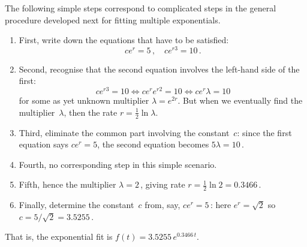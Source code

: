\begin{draft}
\begin{example}
\begin{solution}
The following simple steps correspond to complicated steps in the general procedure developed next for fitting multiple exponentials.
\begin{enumerate}
\item First, write down the equations that have to be satisfied:
\begin{equation*}
ce^{r}=5\,,\quad ce^{r3}=10\,.
\end{equation*}
\item Second, recognise that the second equation involves the left-hand side of the first:
\begin{equation*}
ce^{r3}=10 \iff ce^re^{r2}=10\iff ce^r\lambda=10
\end{equation*}
for some as yet unknown multiplier \(\lambda=e^{2r}\).
But when we eventually find the multiplier~\(\lambda\), then the rate \(r=\tfrac12\ln\lambda\).
\item Third, eliminate the common part involving the constant~\(c\): since the first equation says \(ce^r=5\), the second equation becomes \(5\lambda=10\)\,.
\item Fourth, no corresponding step in this simple scenario.
\item Fifth, hence the multiplier \(\lambda=2\)\,, giving rate \(r=\tfrac12\ln 2=0.3466\)\,.
\item Finally, determine the constant~\(c\) from, say, \(ce^r=5\)\,:
here \(e^r=\sqrt2\) so \(c=5/\sqrt2=3.5255\)\,.
\end{enumerate}
That is, the exponential fit is \(f(t)=3.5255\,e^{0.3466\,t}\).
\end{solution}
\end{example}








\end{draft}
